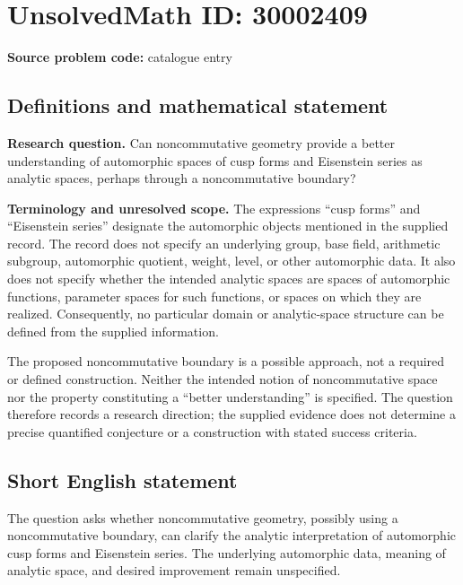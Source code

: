 \documentclass[11pt]{article}
\begin{document}
\section*{UnsolvedMath ID: 30002409}
\textbf{Source problem code:} catalogue entry
\subsection{Definitions and mathematical statement}
\textbf{Research question.} Can noncommutative geometry provide a better understanding of automorphic spaces of cusp forms and Eisenstein series as analytic spaces, perhaps through a noncommutative boundary?

\textbf{Terminology and unresolved scope.} The expressions ``cusp forms'' and ``Eisenstein series'' designate the automorphic objects mentioned in the supplied record. The record does not specify an underlying group, base field, arithmetic subgroup, automorphic quotient, weight, level, or other automorphic data. It also does not specify whether the intended analytic spaces are spaces of automorphic functions, parameter spaces for such functions, or spaces on which they are realized. Consequently, no particular domain or analytic-space structure can be defined from the supplied information.

The proposed noncommutative boundary is a possible approach, not a required or defined construction. Neither the intended notion of noncommutative space nor the property constituting a ``better understanding'' is specified. The question therefore records a research direction; the supplied evidence does not determine a precise quantified conjecture or a construction with stated success criteria.
\subsection{Short English statement}
The question asks whether noncommutative geometry, possibly using a noncommutative boundary, can clarify the analytic interpretation of automorphic cusp forms and Eisenstein series. The underlying automorphic data, meaning of analytic space, and desired improvement remain unspecified.
\end{document}
